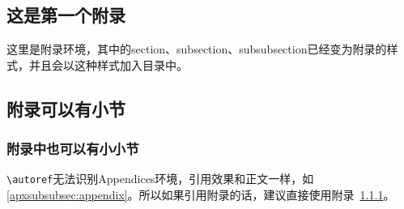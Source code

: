 \documentclass[supercite]{HustGraduPaper}
\begin{document}
\begin{appendices}
	\section{这是第一个附录}
	这里是附录环境，其中的section、subsection、subsubsection已经变为附录的样式，并且会以这种样式加入目录中。
	\subsection{附录可以有小节}
	\subsubsection{附录中也可以有小小节}\label{apxsubsubsec:appendix}
	\verb|\autoref|无法识别Appendices环境，引用效果和正文一样，如\autoref{apxsubsubsec:appendix}。所以如果引用附录的话，建议直接使用附录~\ref{apxsubsubsec:appendix}。
\end{appendices}
\end{document}
